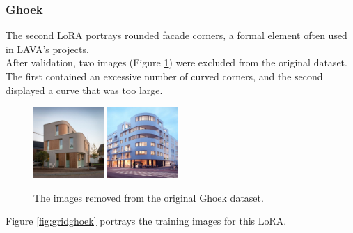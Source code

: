 \subsubsection{Ghoek}
The second LoRA portrays rounded facade corners, a formal element often used in LAVA's projects.\\
After validation, two images (Figure \ref{fig:removedghoek}) were excluded from the original dataset. The first contained an excessive number of curved corners, and the second displayed a curve that was too large.
\begin{figure}[H]
  \centering
  \includegraphics[width=0.24\textwidth]{Images/LoRAs/Ghoek/2.jpg}%
  \hspace{0.005\textwidth} %
  \includegraphics[width=0.24\textwidth]{Images/LoRAs/Ghoek/8.jpg}
  \caption{The images removed from the original Ghoek dataset.}
  \label{fig:removedghoek}
\end{figure}
Figure \ref{fig:gridghoek} portrays the training images for this LoRA.
